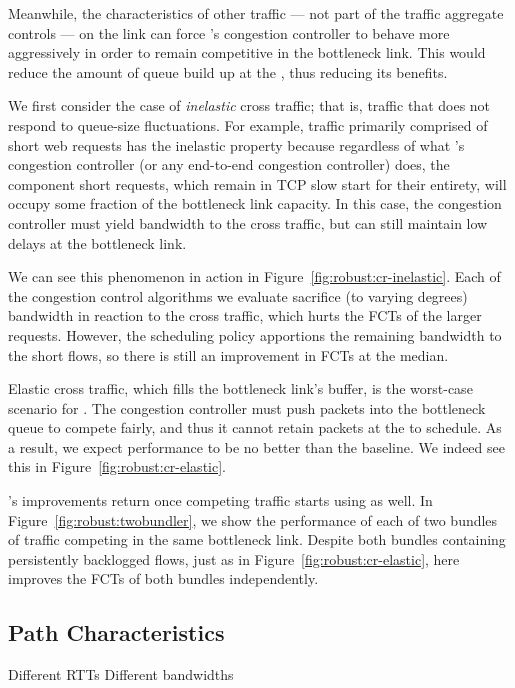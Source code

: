 

Meanwhile, the characteristics of other traffic --- not part of the traffic aggregate \name controls --- on the link can force \name's congestion controller to behave more aggressively in order to remain competitive in the bottleneck link. This would reduce the amount of queue build up at the \name, thus reducing its benefits.


 We first consider the case of \emph{inelastic} cross traffic; that is, traffic that does not respond to queue-size fluctuations.
For example, traffic primarily comprised of short web requests has the inelastic property because regardless of what \name's congestion controller (or any end-to-end congestion controller) does, the component short requests, which remain in TCP slow start for their entirety, will occupy some fraction of the bottleneck link capacity.
In this case, the congestion controller must yield bandwidth to the cross traffic, but can still maintain low delays at the bottleneck link.

We can see this phenomenon in action in Figure~\ref{fig:robust:cr-inelastic}. 
Each of the congestion control algorithms we evaluate sacrifice (to varying degrees) bandwidth in reaction to the cross traffic, which hurts the FCTs of the larger requests.
However, the scheduling policy apportions the remaining bandwidth to the short flows, so there is still an improvement in FCTs at the median.


 Elastic cross traffic, which fills the bottleneck link's buffer, is the worst-case scenario for \name.
The congestion controller must push packets into the bottleneck queue to compete fairly, and thus it cannot retain packets at the \inbox to schedule.
As a result, we expect performance to be no better than the baseline.
We indeed see this in Figure~\ref{fig:robust:cr-elastic}.



 \name's improvements return once competing traffic starts using \name as well. In Figure~\ref{fig:robust:twobundler}, we show the performance of each of two bundles of traffic competing in the same bottleneck link. 
Despite both bundles containing persistently backlogged flows, just as in Figure~\ref{fig:robust:cr-elastic}, here \name improves the FCTs of both bundles independently.

\subsection{Path Characteristics}\label{s:robust:path}
 
\begin{outline}
\1 Different RTTs
\1 Different bandwidths
\end{outline}
